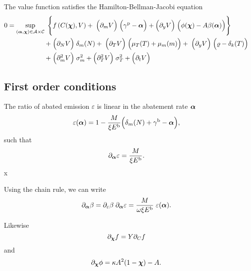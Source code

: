\documentclass[../../main.tex]{subfiles}
\begin{document}
\begin{proposition}
    The value function satisfies the Hamilton-Bellman-Jacobi equation \begin{equation}
        \begin{split}
            0 = \sup_{(\bm{\alpha}, \bm{\chi}) \in \mathcal{A} \times \mathcal{C}} \; \Bigg\{ &f\left(C(\bm{\chi}), V\right) + \;
            \Big(\partial_{m} V \Big) \; \Big(\gamma^{\mathrm{p}} - \bm{\alpha} \Big) + \Big(\partial_{y} V \Big) \;  \Big(\phi(\bm{\chi}) - A \beta(\bm{\alpha}) \Big) \Bigg\} \\
            + \; &\Big(\partial_{N} V\Big) \; \delta_m(N) + \;
            \Big(\partial_T V \Big) \; \Big(\mu_T(T) + \mu_{m}(m) \Big) + \;
            \Big(\partial_{y} V \Big) \; \Big(\varrho - \delta_k(T) \Big) \\
            + \; &\Big(\partial^2_{m} V\Big) \; \sigma^2_m + \Big(\partial^2_{T} V\Big) \; \sigma^2_T + \Big(\partial_t V\Big)
        \end{split}
    \end{equation}
\end{proposition}

\subsection{First order conditions}

The ratio of abated emission $\varepsilon$ is linear in the abatement rate $\bm{\alpha}$ \begin{equation}
    \varepsilon(\bm{\alpha}) = 1 - \frac{M}{\xi E^{\mathrm{b}}} \Big(\delta_m(N) + \gamma^{\mathrm{b}} - \bm{\alpha}\Big),
\end{equation} such that \begin{equation}
    \partial_{\bm{\alpha}} \varepsilon = \frac{M}{\xi E^{\mathrm{b}}}.
\end{equation}x

Using the chain rule, we can write \begin{equation}
    \partial_{\bm{\alpha}} \beta = \partial_{\varepsilon} \beta \; \partial_{\bm{\alpha}} \varepsilon = \frac{M}{\omega \xi E^{\mathrm{b}}} \; \varepsilon(\bm{\alpha}).
\end{equation}

Likewise \begin{equation}
    \partial_{\bm{\chi}} f = Y \partial_{C} f
\end{equation} and \begin{equation}
    \partial_{\bm{\chi}} \phi = \kappa A^2 (1 - \bm{\chi}) - A.
\end{equation}
\end{document}
